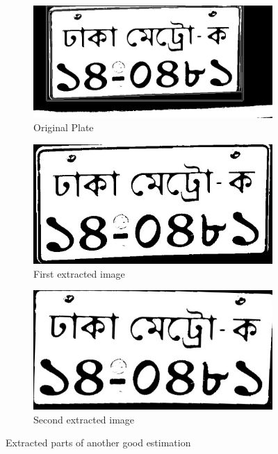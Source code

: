 \begin{figure}
\begin{subfigure}{0.33\textwidth}
    \centering
    \includegraphics[width=0.9\linewidth]{./img/experiment/stage.12/00-good3}
    \caption{Original Plate}
\end{subfigure}
\begin{subfigure}{0.33\textwidth}
    \centering
    \includegraphics[width=0.9\linewidth]{./img/experiment/stage.13/00-00-good3}
    \caption{First extracted image}    
\end{subfigure}
\begin{subfigure}{0.33\textwidth}
    \centering
    \includegraphics[width=0.9\linewidth]{./img/experiment/stage.13/01-00-good3}
    \caption{Second extracted image}
\end{subfigure}
\caption{Extracted parts of another good estimation}
\label{fig:ExtractedResult2}
\end{figure}


